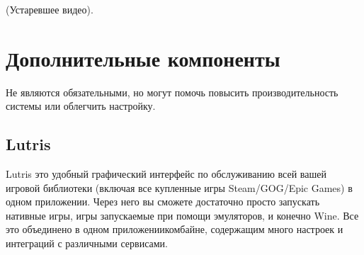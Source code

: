 \documentclass[letterpaper,10pt,russian,openany]{sphinxmanual}
\begin{document}
\sphinxAtStartPar
{} (Устаревшее видео).

\sphinxAtStartPar
{}

\sphinxAtStartPar
{}

\sphinxAtStartPar
{}

\sphinxAtStartPar
{}

\sphinxAtStartPar
{}

\sphinxAtStartPar
{}

\sphinxAtStartPar
{}

\sphinxAtStartPar
{}

\ignorespaces 

\section{Дополнительные компоненты}
\label{\detokenize{source/linux-gaming:additional-components}}\label{\detokenize{source/linux-gaming:index-13}}\label{\detokenize{source/linux-gaming:id11}}
\sphinxAtStartPar
Не являются обязательными, но могут помочь повысить производительность системы или облегчить настройку.

\ignorespaces 

\subsection{Lutris}
\label{\detokenize{source/linux-gaming:lutris}}\label{\detokenize{source/linux-gaming:lutris-and-additions}}\label{\detokenize{source/linux-gaming:index-14}}
\sphinxAtStartPar
Lutris \sphinxhyphen{} это удобный графический интерфейс по обслуживанию всей вашей игровой библиотеки
(включая все купленные игры Steam/GOG/Epic Games) в одном приложении.
Через него вы сможете достаточно просто запускать нативные игры, игры запускаемые при помощи эмуляторов, и конечно Wine.
Все это объединено в одном приложении\sphinxhyphen{}комбайне, содержащим много настроек и интеграций с различными сервисами.
\end{document}

